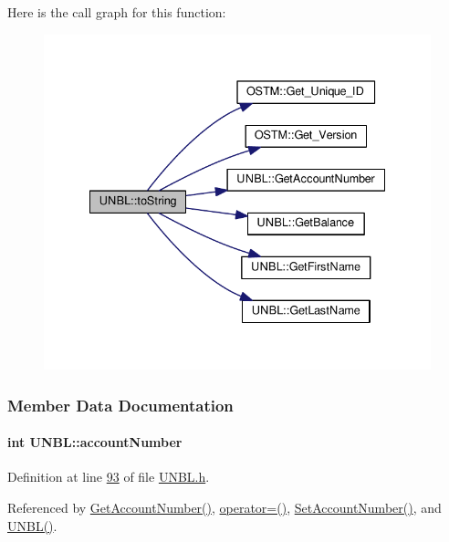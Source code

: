 Here is the call graph for this function\+:
\nopagebreak
\begin{figure}[H]
\begin{center}
\leavevmode
\includegraphics[width=335pt]{class_u_n_b_l_a76d8bba21d64d79d8de63763b8acc1fd_a76d8bba21d64d79d8de63763b8acc1fd_cgraph}
\end{center}
\end{figure}




\subsubsection{Member Data Documentation}
\paragraph[{\texorpdfstring{account\+Number}{accountNumber}}]{\setlength{\rightskip}{0pt plus 5cm}int U\+N\+B\+L\+::account\+Number\hspace{0.3cm}{\ttfamily [private]}}\hypertarget{class_u_n_b_l_a90763c3044159862bcb9cd51d6b09f34_a90763c3044159862bcb9cd51d6b09f34}{}\label{class_u_n_b_l_a90763c3044159862bcb9cd51d6b09f34_a90763c3044159862bcb9cd51d6b09f34}


Definition at line \hyperlink{_u_n_b_l_8h_source_l00093}{93} of file \hyperlink{_u_n_b_l_8h_source}{U\+N\+B\+L.\+h}.



Referenced by \hyperlink{_u_n_b_l_8cpp_source_l00075}{Get\+Account\+Number()}, \hyperlink{_u_n_b_l_8h_source_l00060}{operator=()}, \hyperlink{_u_n_b_l_8cpp_source_l00071}{Set\+Account\+Number()}, and \hyperlink{_u_n_b_l_8h_source_l00022}{U\+N\+B\+L()}.

